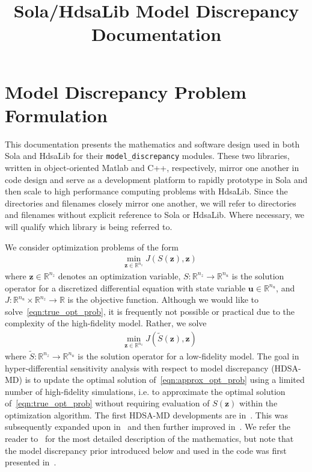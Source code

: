 \documentclass[11pt]{article}
\title{Sola/HdsaLib Model Discrepancy Documentation}
\author{}
\date{}
\newcommand{\R}{\mathbb{R}}
\renewcommand{\u}{\bm{u}}
\newcommand{\z}{\bm{z}}
\newcommand{\0}{\bm{0}}
\begin{document}
\maketitle

\section*{Model Discrepancy Problem Formulation}
This documentation presents the mathematics and software design used in both Sola and HdsaLib for their \texttt{model\_discrepancy} modules. These two libraries, written in object-oriented Matlab and C++, respectively, mirror one another in code design and serve as a development platform to rapidly prototype in Sola and then scale to high performance computing problems with HdsaLib. Since the directories and filenames closely mirror one another, we will refer to directories and filenames without explicit reference to Sola or HdsaLib. Where necessary, we will qualify which library is being referred to.

We consider optimization problems of the form
\begin{align}
\label{eqn:true_opt_prob}
& \min_{\z \in \R^{n_z}} J(S(\z),\z) 
\end{align}
where $\z \in \R^{n_z}$ denotes an optimization variable, $S:\R^{n_z} \to \R^{n_u}$ is the solution operator for a discretized differential equation with state variable $\u \in \R^{n_u}$, and $J:\R^{n_u} \times \R^{n_z} \to \R$ is the objective function. Although we would like to solve~\eqref{eqn:true_opt_prob}, it is frequently not possible or practical due to the complexity of the high-fidelity model. Rather, we solve
\begin{align}
\label{eqn:approx_opt_prob}
& \min_{\z \in \R^{n_z}} J(\tilde{S}(\z),\z) 
\end{align}
where $\tilde{S}:\R^{n_z} \to \R^{n_u}$ is the solution operator for a low-fidelity model. The goal in hyper-differential sensitivity analysis with respect to model discrepancy (HDSA-MD) is to update the optimal solution of~\eqref{eqn:approx_opt_prob} using a limited number of high-fidelity simulations, i.e. to approximate the optimal solution of~\eqref{eqn:true_opt_prob} without requiring evaluation of $S(\z)$ within the optimization algorithm. The first HDSA-MD developments are in~\cite{hart2023hdsaoptimal}. This was subsequently expanded upon in~\cite{hart2024hdsasampling} and then further improved in~\cite{hart2025hdsaprior}. We refer the reader to~\cite{hart2024hdsasampling} for the most detailed description of the mathematics, but note that the model discrepancy prior introduced below and used in the code was first presented in~\cite{hart2025hdsaprior}.
\end{document}
